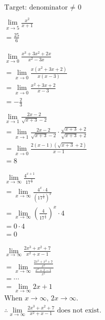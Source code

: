 \documentclass{article}
\begin{document}
\raggedcolumns
\begin{multicols}{3}

\noindent\begin{align*}
	&\text{Target: denominator $\neq$ 0} \\
	\\
	&\lim_{x \to 5} \frac{x^2}{x+1} \\
	&= \frac{25}{6} \\
	\\
	\\
	&\lim_{x \to 0} \frac{x^3+3x^2+2x}{x^2-3x} \\
	&= \lim_{x \to 0} \frac{x(x^2+3x+2)}{x(x-3)} \\
	&= \lim_{x \to 0} \frac{x^2+3x+2}{x-3} \\
	&= -\frac{2}{3}
	\\
	\\
	&\lim_{x \to 1} \frac{2x-2}{\sqrt{x+3}-2} \\
	&= \lim_{x \to 1} \frac{2x-2}{\sqrt{x+3}-2} \cdot \frac{\sqrt{x+3}+2}{\sqrt{x+3}+2} \\
	&= \lim_{x \to 0} \frac{2(x-1)(\sqrt{x+3}+2)}{x-1} \\
	&= 8 \\
	\\
	\\
	&\lim_{x \to \infty} \frac{4^{x+1}}{17^{\frac{x}{2}}} \\
	&= \lim_{x \to \infty} \frac{4^x\cdot4}{(17^{\frac{1}{2}})^x} \\
	&= \lim_{x \to \infty} (\frac{4}{17^{\frac{1}{2}}})^x \cdot 4 \\
	&= 0 \cdot 4 \\
	&= 0 \\
	\\
	\\
	&\lim_{x \to \infty} \frac{2x^3+x^2+7}{x^2+x-1} \\
	&= \lim_{x \to \infty} \frac{\frac{2x^3+x^2+7}{x^2}}{\frac{x^2+x-1}{x^2}} \\
	&= \cdots \\
	&= \lim_{x \to \infty} 2x + 1 \\
	&\text{When $x \to \infty$, $2x \to \infty$.} \\
	&\therefore \text{$\lim_{x \to \infty} \frac{2x^3+x^2+7}{x^2+x-1}$ does not exist.}
\end{align*}

\columnbreak


\end{multicols}
\end{document}
